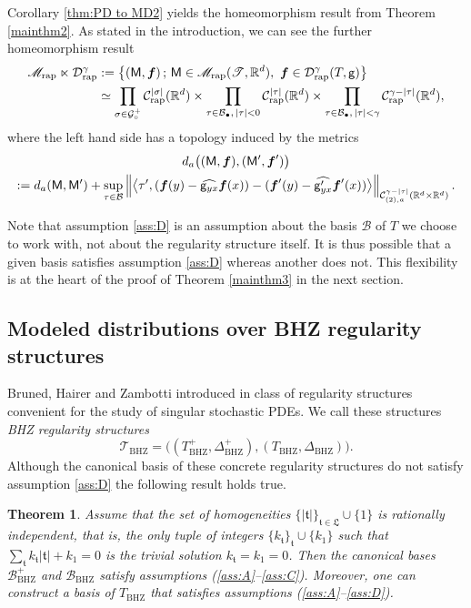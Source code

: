 \documentclass[11pt]{article}
\numberwithin{equation}{section}
\newcommand{\sbullet}{{\scriptscriptstyle\bullet}}
\theoremstyle{plain}
\newtheorem{thm}{Theorem}
\theoremstyle{definition}
\newcommand{\bsf}{\boldsymbol{f}}
\newcommand{\rap}{\mathrm{rap}}
\newcommand{\BHZ}{{\scriptscriptstyle\mathrm{BHZ}}}
\newcommand{\scrM}{\mathscr{M}}
\newcommand{\scrT}{\mathscr{T}}
\newcommand{\frkt}{\mathfrak{t}}
\newcommand{\bbR}{\mathbb{R}}
\newcommand{\mcB}{\mathcal{B}}
\newcommand{\mcC}{\mathcal{C}}
\newcommand{\mcD}{\mathcal{D}}
\newcommand{\mcG}{\mathcal{G}}
\begin{document}
Corollary \ref{thm:PD to MD2} yields the homeomorphism result from Theorem \ref{mainthm2}. As stated in the introduction, we can see the further homeomorphism result
\begin{align*}
\scrM_{\rap}\ltimes\mcD_{\rap}^\gamma
&:=\left\{
({\sf M},\bsf)\,;\, {\sf M}\in\scrM_{\rap}(\scrT,\bbR^d),\ \bsf\in\mcD_{\rap}^\gamma(T,{\sf g}) \right\}\\
&\simeq
\prod_{\sigma\in\mcG_\circ^+} \mcC_\rap^{|\sigma|}(\bbR^d) \times \prod_{\tau\in\mcB_\sbullet,\,|\tau|<0} \mcC_\rap^{|\tau|}(\bbR^d)
\times \prod_{\tau\in\mcB_\sbullet,\, |\tau|<\gamma} \mcC_\rap^{\gamma-|\tau|}(\bbR^d),
\end{align*}
where the left hand side has a topology induced by the metrics
\begin{multline*}
d_a\bigl(({\sf M},\bsf),({\sf M}',\bsf') \bigr)\\
:=d_a({\sf M},{\sf M}')
+\sup_{\tau\in\mcB}\left\| \big\langle \tau',
(\bsf(y)-\widehat{{\sf g}_{yx}}\bsf(x))-(\bsf'(y)-\widehat{{\sf g}'_{yx}}\bsf'(x))
\big\rangle \right\|_{\mcC_{(2),a}^{\gamma-|\tau|}(\bbR^d\times\bbR^d)}.
\end{multline*}

Note that assumption \eqref{ass:D} is an assumption about the basis $\mcB$ of $T$ we choose to work with, not about the regularity structure itself. It is thus possible that a given basis satisfies assumption \eqref{ass:D} whereas another does not. This flexibility is at the heart of the proof of Theorem \ref{mainthm3} in the next section.

\subsection{Modeled distributions over BHZ regularity structures}
\label{SubsectionBHZ-RS}

Bruned, Hairer and Zambotti introduced in \cite{BHZ} class of regularity structures convenient for the study of singular stochastic PDEs. We call these structures \emph{BHZ regularity structures}
\[
\scrT_\BHZ = \bigl((T_{\BHZ}^+,\Delta^+_{\BHZ}), (T_{\BHZ},\Delta_{\BHZ})\bigr).
\]
Although the canonical basis of these concrete regularity structures do not satisfy assumption \eqref{ass:D} the following result holds true.

\begin{thm} \label{prop:reduction of antiderivative}
Assume that the set of homogeneities $\{|\mathfrak{t}|\}_{\mathfrak{t}\in\mathfrak{L}}\cup\{1\}$ is rationally independent, that is, the only tuple of integers $\{k_{\mathfrak{t}}\}_{\frkt}\cup\{k_1\}$ such that $\sum_{\mathfrak{t}}k_{\mathfrak{t}}|\mathfrak{t}|+k_1=0$ is the trivial solution $k_{\mathfrak{t}}=k_1=0$. Then the canonical bases $\mcB_{\BHZ}^+$ and $\mcB_{\BHZ}$ satisfy assumptions \textup{(\ref{ass:A}--\ref{ass:C})}.
Moreover, one can construct a basis of $T_{\BHZ}$ that satisfies assumptions \textup{(\ref{ass:A}--\ref{ass:D})}.
\end{thm}
\end{document}

